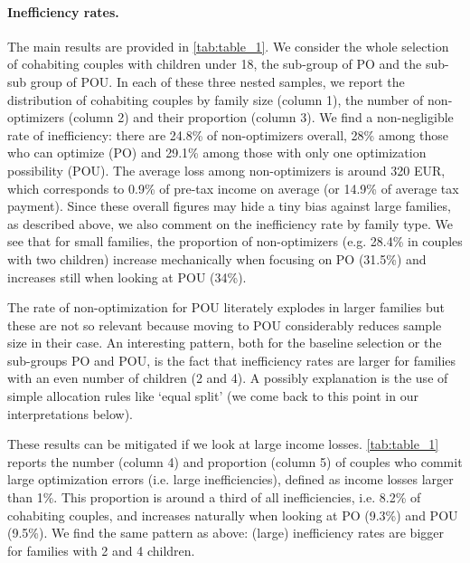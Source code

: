 \paragraph{Inefficiency rates.}
The main results are provided in \autoref{tab:table_1}. We consider the whole selection of cohabiting couples with children under 18, the sub-group of PO and the sub-sub group of POU. In each of these three nested samples, we report the distribution of cohabiting couples by family size (column 1), the number of non-optimizers (column 2) and their proportion (column 3). We find a non-negligible rate of inefficiency: there are 24.8\% of non-optimizers overall, 28\% among those who can optimize (PO) and 29.1\% among those with only one optimization possibility (POU). The average loss among non-optimizers is around 320 EUR, which corresponds to 0.9\% of pre-tax income on average (or 14.9\% of average tax payment). Since these overall figures may hide a tiny bias against large families, as described above, we also comment on the inefficiency rate by family type. We see that for small families, the proportion of non-optimizers (e.g. 28.4\% in couples with two children) increase mechanically when focusing on PO (31.5\%) and increases still when looking at POU (34\%). 


\medskip
The rate of non-optimization for POU literately explodes in larger families but these are not so relevant because moving to POU considerably reduces sample size in their case. An interesting pattern, both for the baseline selection or the sub-groups PO and POU, is the fact that inefficiency rates are larger for families with an even number of children (2 and 4). A possibly explanation is the use of simple allocation rules like ‘equal split’ (we come back to this point in our interpretations below).


\medskip
These results can be mitigated if we look at large income losses. \autoref{tab:table_1} reports the number (column 4) and proportion (column 5) of couples who commit large optimization errors (i.e. large inefficiencies), defined as income losses larger than 1\%. This proportion is around a third of all inefficiencies, i.e. 8.2\% of cohabiting couples, and increases naturally when looking at PO (9.3\%) and POU (9.5\%). We find the same pattern as above: (large) inefficiency rates are bigger for families with 2 and 4 children. 




 \medskip

